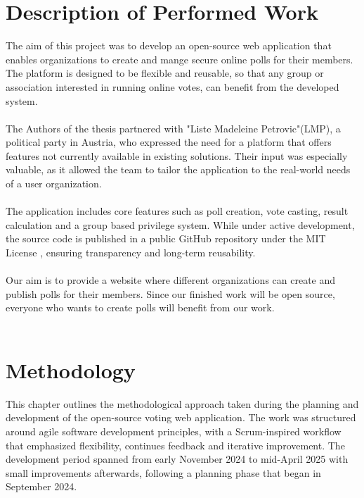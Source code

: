\documentclass[a4paper,12pt]{report}
\begin{document}
\section{Description of Performed Work}
The aim of this project was to develop an open-source web application that enables organizations to create and mange secure online polls for their members. The platform is designed to be flexible and reusable, so that any group or association interested in running online votes, can benefit from the developed system.\\\\
The Authors of the thesis partnered with "Liste Madeleine Petrovic"(LMP), a political party in Austria, who expressed the need for a platform that offers features not currently available in existing solutions. Their input was especially valuable, as it allowed the team to tailor the application to the real-world needs of a user organization.\\\\
The application includes core features such as poll creation, vote casting, result calculation and a group based privilege system. While under active development, the source code is published in a public GitHub repository under the MIT License \parencite{opensourceinit}, ensuring transparency and long-term reusability. \\\\
Our aim is to provide a website where different organizations can create and publish polls for their members. Since our finished work will be open source, everyone who wants to create polls will benefit from our work. \\ \\

\section{Methodology}
This chapter outlines the methodological approach taken during the planning and development of the open-source voting web application. The work was structured around agile software development principles, with a Scrum-inspired workflow that emphasized flexibility, continues feedback and iterative improvement. The development period spanned from early November 2024 to mid-April 2025 with small improvements afterwards, following a planning phase that began in September 2024. \\
\end{document}
